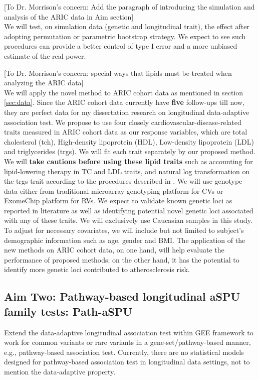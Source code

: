 \documentclass[12pt]{article}
\begin{document}
[To Dr. Morrison's concern: Add the paragraph of introducing the simulation and analysis of the ARIC data in Aim section]\\
We will test, on simulation data (genetic and longitudinal trait), the effect after adopting permutation or parametric bootstrap strategy. We expect to see such procedures can provide a better control of type I error and a more unbiased estimate of the real power.

[To Dr. Morrison's concern: special ways that lipids must be treated when analyzing the ARIC data]\\
We will apply the novel method to ARIC cohort data as mentioned in section \ref{sec:data}. Since the ARIC cohort data currently have \textbf{five} follow-ups till now, they are perfect data for my dissertation research on longitudinal data-adaptive association test. We propose to use four closely cardiovascular-disease-related traits measured in ARIC cohort data as our response variables, which are total cholesterol (tch), High-density lipoprotein (HDL), Low-density lipoprotein (LDL) and triglycerides (trgs). We will fit each trait separately by our proposed method. We will \textbf{take cautions before using these lipid traits} such as accounting for lipid-lowering therapy in TC and LDL traits, and natural log transformation on the trgs trait according to the procedures described in \cite{Peloso2014}. We will use genotype data either from traditional microarray genotyping platform for CVs or ExomeChip platform for RVs. We expect to validate known genetic loci as reported in literature \cite{Teslovich2010,Lange2014,Peloso2014,Consortium2013,Maxwell2013} as well as identifying potential novel genetic loci associated with any of these traits. We will exclusively use Caucasian samples in this study. To adjust for necessary covariates, we will include but not limited to subject's demographic information such as age, gender and BMI. The application of the new methods on ARIC cohort data, on one hand, will help evaluate the performance of proposed methods; on the other hand, it has the potential to identify more genetic loci contributed to atherosclerosis risk.
\subsection{Aim Two: Pathway-based longitudinal aSPU family tests: Path-aSPU}
Extend the data-adaptive longitudinal association test within GEE framework to work for common variants or rare variants in a gene-set/pathway-based manner, e.g., pathway-based association test. Currently, there are no statistical models designed for pathway-based association test in longitudinal data settings, not to mention the data-adaptive property.
\end{document}
